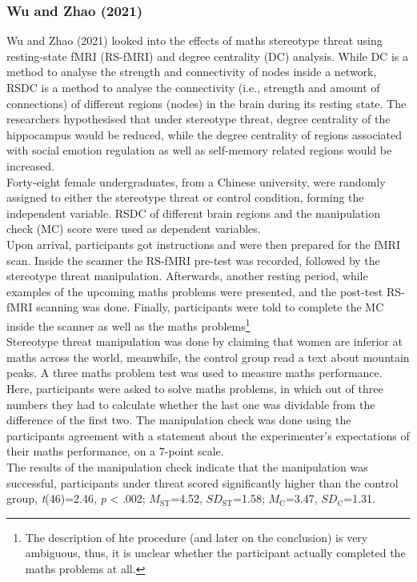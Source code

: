 \documentclass[
  stu]{apa7}
\begin{document}
\subsubsection{Wu and Zhao (2021)}\label{wudegreecentralitybrain2021}

Wu and Zhao (2021) looked into the effects of maths stereotype threat using resting-state fMRI (RS-fMRI) and degree centrality (DC) analysis.
While DC is a method to analyse the strength and connectivity of nodes inside a network, RSDC is a method to analyse the connectivity (i.e., strength and amount of connections) of different regions (nodes) in the brain during its resting state.
The researchers hypothesised that under stereotype threat, degree centrality of the hippocampus would be reduced, while the degree centrality of regions associated with social emotion regulation as well as self-memory related regions would be increased.\\
Forty-eight female undergraduates, from a Chinese university, were randomly assigned to either the stereotype threat or control condition, forming the independent variable.
RSDC of different brain regions and the manipulation check (MC) score were used as dependent variables.\\
Upon arrival, participants got instructions and were then prepared for the fMRI scan.
Inside the scanner the RS-fMRI pre-test was recorded, followed by the stereotype threat manipulation.
Afterwards, another resting period, while examples of the upcoming maths problems were presented, and the post-test RS-fMRI scanning was done.
Finally, participants were told to complete the MC inside the scanner as well as the maths problems\footnote{The description of hte procedure (and later on the conclusion) is very ambiguous, thus, it is unclear whether the participant actually completed the maths problems at all.}\\
Stereotype threat manipulation was done by claiming that women are inferior at maths across the world, meanwhile, the control group read a text about mountain peaks.
A three maths problem test was used to measure maths performance.
Here, participants were asked to solve maths problems, in which out of three numbers they had to calculate whether the last one was dividable from the difference of the first two.
The manipulation check was done using the participants agreement with a statement about the experimenter's expectations of their maths performance, on a 7-point scale.\\
The results of the manipulation check indicate that the manipulation was successful, participants under threat scored significantly higher than the control group, \emph{t}(46)=2.46, \emph{p} \textless{} .002; \(M_{\text{ST}}\)=4.52, \(SD_{\text{ST}}\)=1.58; \(M_{\text{C}}\)=3.47, \(SD_{\text{C}}\)=1.31.
\end{document}
